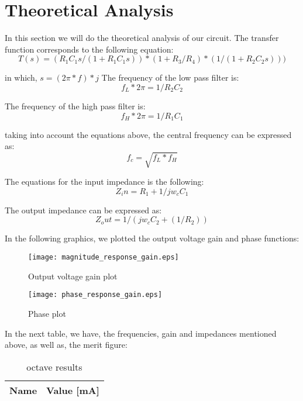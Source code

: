 \section{Theoretical Analysis}
\label{sec:analysis}

In this section we will do the theoretical analysis of our circuit.
The transfer function corresponds to the following equation:
\begin{equation}
	T(s) = (R_1C_1s/(1 + R_1C_1s))*(1 + R_3/R_4)*(1/(1 + R_2C_2s)))
\end{equation}

in which, $s = (2\pi*f)*j$
The frequency of the low pass filter is:
\begin{equation}
	f_L*2\pi = 1/R_2C_2
\end{equation}

The frequency of the high pass filter is:
\begin{equation}
	f_H*2\pi = 1/R_1C_1
\end{equation}

taking into account the equations above, the central frequency can be expressed as:
\begin{equation}
	f_c = \sqrt{f_L*f_H}
\end{equation}

The equations for the input impedance is the following:
\begin{equation}
	Z_in = R_1 + 1/jw_cC_1
\end{equation}

The output impedance can be expressed as:
\begin{equation}
	Z_out = 1/(jw_cC_2 + (1/R_2))
\end{equation}
	
In the following graphics, we plotted the output voltage gain and phase functions:
\begin{figure}[H] \centering
\texttt{[image: magnitude\_response\_gain.eps]}
\caption{Output voltage gain plot}
\label{fig:rc4}
\end{figure}

\begin{figure}[H] \centering
	\texttt{[image: phase\_response\_gain.eps]}
	\caption{Phase plot}
	\label{fig:rc4}
\end{figure}

In the next table, we have, the frequencies, gain and impedances mentioned above, as well as, the merit figure: 

\begin{table}[H]
	\centering
	\begin{tabular}{|l|r|}
		\hline    
		{\bf Name} & {\bf Value [mA]} \\ \hline
		
	\end{tabular}
	\caption{octave results}
	\label{tab:op}
\end{table}
